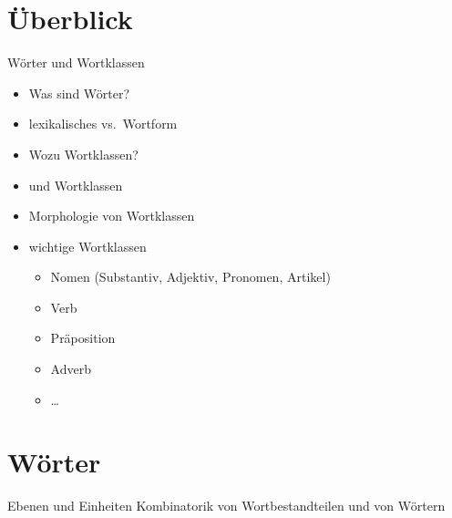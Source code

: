 \section{Überblick}

\begin{frame}
  {Wörter und Wortklassen}
  \pause
  \begin{itemize}[<+->]
    \item Was sind Wörter?
    \item lexikalisches vs.\ Wortform
      \Halbzeile
    \item Wozu Wortklassen?
    \item {} und Wortklassen
    \item \alert{Morphologie} von Wortklassen
      \Halbzeile
    \item wichtige Wortklassen
      \begin{itemize}[<+->]
        \item Nomen (Substantiv, Adjektiv, Pronomen, Artikel)
        \item Verb
        \item Präposition
        \item Adverb
        \item \ldots
      \end{itemize}
  \end{itemize}
\end{frame}


\section{Wörter}

\begin{frame}
  {Ebenen und Einheiten}
  \pause
  Kombinatorik von Wortbestandteilen und von Wörtern
  \pause
  \Zeile
  \begin{exe}
    \ex
    \begin{xlist}
      \pause
    \end{xlist}
    \pause
    \Zeile
    \ex
    \begin{xlist}
      \pause
    \end{xlist}
  \end{exe}
\end{frame}

